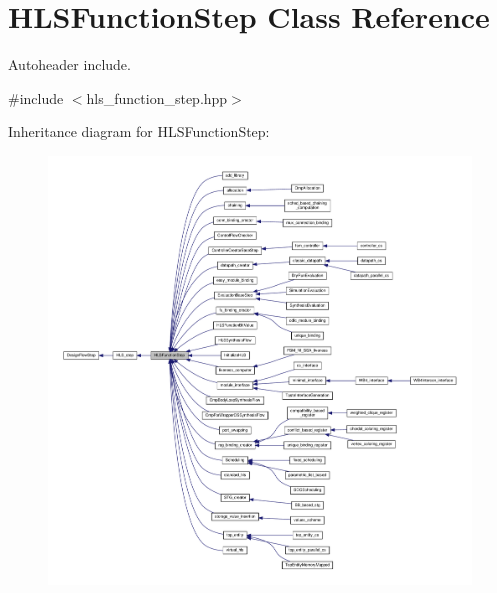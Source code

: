 \hypertarget{classHLSFunctionStep}{}\section{H\+L\+S\+Function\+Step Class Reference}
\label{classHLSFunctionStep}


Autoheader include.  




{\ttfamily \#include $<$hls\+\_\+function\+\_\+step.\+hpp$>$}



Inheritance diagram for H\+L\+S\+Function\+Step\+:
\nopagebreak
\begin{figure}[H]
\begin{center}
\leavevmode
\includegraphics[width=350pt]{d4/d28/classHLSFunctionStep__inherit__graph}
\end{center}
\end{figure}


